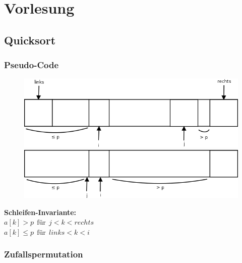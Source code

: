 \chapter{Vorlesung}
\vspace{-30pt}
\section{Quicksort}
\vspace{-20pt}
\subsection{Pseudo-Code}
\vspace{-30pt}

\begin{figure}
\vspace{-70pt}
\includegraphics[width=\linewidth]{06/Grafik/img1.png}
\includegraphics[width=\linewidth]{06/Grafik/img2.png}
\caption{}
\end{figure}

\vspace{0pt}
\textbf{Schleifen-Invariante:}\\
$a[k] > p~~\text{für}~~j <k<rechts$\\
$a[k] \leq p ~~\text{für}~~links<k<i$ 
\vspace{50pt}

\pagebreak 

\subsection{Zufallspermutation}



